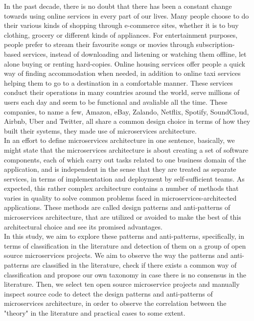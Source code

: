 \documentclass{Configuration_Files/PoliMi3i_thesis}
\begin{document}
In the past decade, there is no doubt that there has been a constant change towards using online services in every part of our lives.
Many people choose to do their various kinds of shopping through e-commerce sites, whether it is to buy clothing, grocery or different kinds of appliances.
For entertainment purposes, people prefer to stream their favourite songs or movies through subscription-based services, instead of downloading and listening or watching them offline, let alone buying or renting hard-copies.
Online housing services offer people a quick way of finding accommodation when needed, in addition to online taxi services helping them to go to a destination in a comfortable manner.
These services conduct their operations in many countries around the world, serve millions of users each day and seem to be functional and avaliable all the time.
These companies, to name a few, Amazon, eBay, Zalando, Netflix, Spotify, SoundCloud, Airbnb, Uber and Twitter, all share a common design choice in terms of how they built their systems, they made use of microservices architecture.
\\
In an effort to define microservices architecture in one sentence, basically, we might state that the microservices architecture is about creating a set of software components, each of which carry out tasks related to one business domain of the application, and is independent in the sense that they are treated as separate services, in terms of implementation and deployment by self-sufficient teams.
As expected, this rather complex architecture contains a number of methods that varies in quality to solve common problems faced in microservices-architected applications.
These methods are called design patterns and anti-patterns of microservices architecture, that are utilized or avoided to make the best of this architectural choice and see its promised advantages.
\\
In this study, we aim to explore these patterns and anti-patterns, specifically, in terms of classification in the literature and detection of them on a group of open source microservices projects.
We aim to observe the way the patterns and anti-patterns are classified in the literature, check if there exists a common way of classification and propose our own taxonomy in case there is no consensus in the literature.
Then, we select ten open source microservice projects and manually inspect source code to detect the design patterns and anti-patterns of microservices architecture, in order to observe the correlation between the "theory" in the literature and practical cases to some extent.
\end{document}

